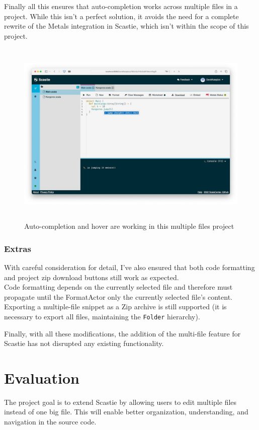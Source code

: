 \documentclass[a4paper,11pt,oneside]{report}
\begin{document}
Finally all this ensures that auto-completion works across multiple files in a project. While this isn't a perfect solution, it avoids the need for a complete rewrite of the Metals integration in Scastie, which isn't within the scope of this project.

\begin{figure}[h]
\centering
\includegraphics[height=9cm]{completion.jpeg}
\caption{Auto-completion and hover are working in this multiple files project}
\end{figure}

\subsection{Extras}

With careful consideration for detail, I've also ensured that both code formatting and project zip download buttons still work as expected.\\
Code formatting depends on the currently selected file and therefore must propagate until the FormatActor only the currently selected file's content.\\
Exporting a multiple-file snippet as a Zip archive is still supported (it is necessary to export all files, maintaining the \lstinline{Folder} hierarchy).

Finally, with all these modifications, the addition of the multi-file feature for Scastie has not disrupted any existing functionality.

\chapter{Evaluation}
The project goal is to extend Scastie by allowing users to edit multiple files instead of one big file. This will enable better organization, understanding, and navigation in the source code.
\end{document}
